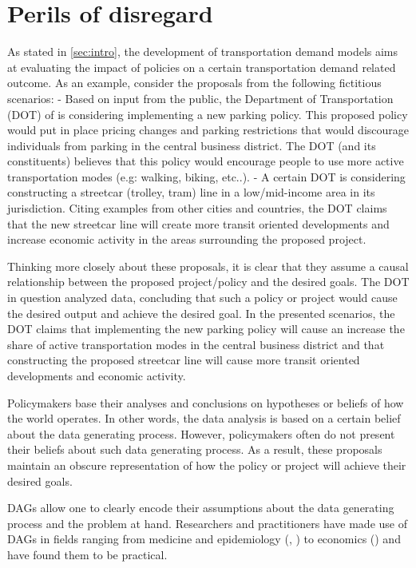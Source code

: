 \section{Perils of disregard}
\label{sec:graph-importance}

As stated in \ref{sec:intro}, the development of transportation demand models aims at evaluating the impact of policies on a certain
transportation demand related outcome. As an example, consider the proposals from the following fictitious scenarios: 
- Based on input from the public, the Department of Transportation (DOT) of  is considering implementing a new parking policy. 
This proposed policy would put in place pricing changes and parking restrictions that would discourage individuals from parking in the central business district. 
The DOT (and its constituents) believes that this policy would encourage people to use more active transportation modes (e.g: walking, biking, etc..).
- A certain DOT is considering constructing a streetcar (trolley, tram) line in a low/mid-income area in its jurisdiction.
Citing examples from other cities and countries, the DOT claims that the new streetcar line will create more transit oriented
developments and increase economic activity in the areas surrounding the proposed project. 


Thinking more closely about these proposals, it is clear that they assume a causal relationship between the proposed project/policy and the desired goals. 
The DOT in question analyzed data, concluding that such a policy or project would cause the desired output and achieve the desired goal.
In the presented scenarios, the DOT claims that implementing the new parking policy will cause an increase the share of 
active transportation modes in the central business district and that constructing the proposed streetcar line will 
cause more transit oriented developments and economic activity.

Policymakers base their analyses and conclusions on hypotheses or beliefs of how the world operates.
In other words, the data analysis is based on a certain belief about the data generating process.
However, policymakers often do not present their beliefs about such data generating process.
As a result, these proposals maintain an obscure representation of how the policy or project will achieve their desired goals. 

DAGs allow one to clearly encode their assumptions about the data generating process and the problem at hand.
Researchers and practitioners have made use of DAGs in fields ranging from medicine and epidemiology (\citet{shrier_platt_2008}, \citet{sung_2011}) to economics (\citet{white2011causal}) and have found them to be practical.

